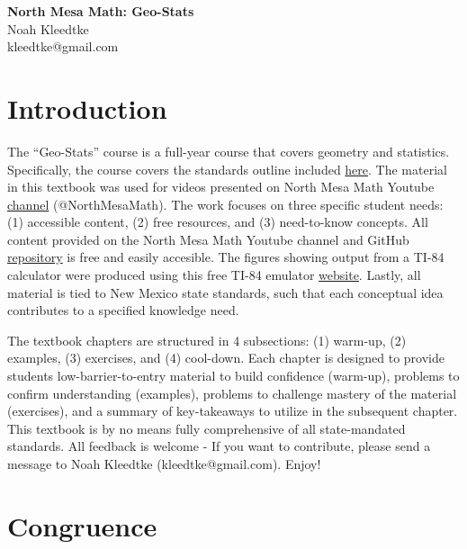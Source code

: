 \documentclass[12pt, oneside]{book}
\begin{document}
\begin{titlepage}
    \centering
    \vspace*{5cm}
    {\Huge \bfseries North Mesa Math: Geo-Stats} \\[1.5cm]
    {\Large Noah Kleedtke} \\
    {\Large kleedtke@gmail.com} \\
    \vfill
\end{titlepage}

\frontmatter
\tableofcontents

\mainmatter
\chapter{Introduction}

The ``Geo-Stats'' course is a full-year course that covers geometry and statistics. Specifically, the course covers the standards outline included \href{web.ped.nm.gov}{here}. The material in this textbook was used for videos presented on North Mesa Math Youtube \href{youtube.com/@NorthMesaMath}{channel} (@NorthMesaMath). The work focuses on three specific student needs: (1) accessible content, (2) free resources, and (3) need-to-know concepts. All content provided on the North Mesa Math Youtube channel and GitHub \href{https://github.com/nkleedtke/NorthMesaMath/}{repository} is free and easily accesible. The figures showing output from a TI-84 calculator were produced using this free TI-84 emulator \href{https://ti84calc.com/ti84calc}{website}. Lastly, all material is tied to New Mexico state standards, such that each conceptual idea contributes to a specified knowledge need.

The textbook chapters are structured in 4 subsections: (1) warm-up, (2) examples, (3) exercises, and (4) cool-down. Each chapter is designed to provide students low-barrier-to-entry material to build confidence (warm-up), problems to confirm understanding (examples), problems to challenge mastery of the material (exercises), and a summary of key-takeaways to utilize in the subsequent chapter. This textbook is by no means fully comprehensive of all state-mandated standards. All feedback is welcome - If you want to contribute, please send a message to Noah Kleedtke (kleedtke@gmail.com). Enjoy!

\chapter{Congruence}
\end{document}
